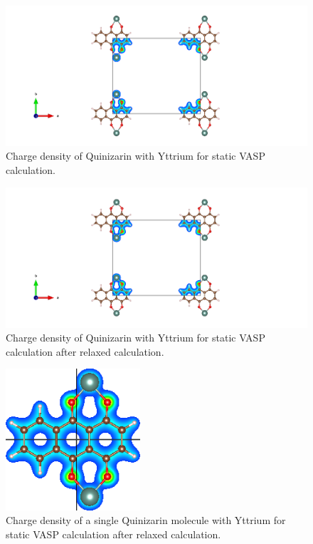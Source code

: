 \documentclass{article}
\begin{document}
      \begin{figure}[H]
        \centering
        \includegraphics[width = \textwidth]{../fig/Y_staticbefore_CHGCAR.png}
        \caption{Charge density of Quinizarin with Yttrium for static VASP calculation. }
        \label{fig:Y_staticbefore_CHGCAR}
      \end{figure}

      \begin{figure}[H]
        \centering
        \includegraphics[width = \textwidth]{../fig/Y_staticafter_CHGCAR.png}
        \caption{Charge density of Quinizarin with Yttrium for static VASP calculation after relaxed calculation. }
        \label{fig:Y_staticafter_CHGCAR}
      \end{figure}

      \begin{figure}[H]
        \centering
        \includegraphics[width = 5cm]{../fig/Y_staticafter_CHGDENSITY.png}
        \caption{Charge density of a single Quinizarin molecule with Yttrium for static VASP calculation after relaxed calculation. }
        \label{fig:Y_staticafter_CHGDENSITY}
      \end{figure}
\end{document}
